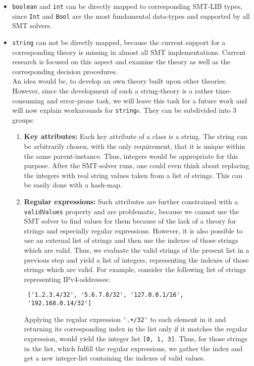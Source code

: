 \begin{itemize}
 \item \verb|boolean| and \verb|int| can be directly mapped to corresponding SMT-LIB types, since \verb|Int| and \verb|Bool| are the most fundamental data-types and supported by all SMT solvers.


 \item \verb|string| can not be directly mapped, because the current support for a corresponding theory is missing in almost all SMT implementations. Current research is focused on this aspect and examine the theory as well as the corresponding decision procedures.\\

 An idea would be, to develop an own theory built upon other theories. However, since the development of such a string-theory is a rather time-consuming and error-prone task, we will leave this task for a future work and will now explain workarounds for \verb|string|s. They can be subdivided into 3 groups:
 \begin{enumerate}
  \item \textbf{Key attributes:} Each key attribute of a class is a string. The string can be arbitrarily chosen, with the only requirement, that it is unique within the same parent-instance. Thus, integers would be appropriate for this purpose. After the SMT-solver runs, one could even think about replacing the integers with real string values taken from a list of strings. This can be easily done with a hash-map.
 
  \item \textbf{Regular expressions:} Such attributes are further constrained with a \verb|validValues| property and are problematic, because we cannot use the SMT solver to find values for them because of the lack of a theory for strings and especially regular expressions. However, it is also possible to use an external list of strings and then use the indexes of those strings which are valid. Thus, we evaluate the valid strings of the present list in a previous step and yield a list of integers, representing the indexes of those strings which are valid. For example, consider the following list of strings representing IPv4-addresses: \begin{verbatim}
 ['1.2.3.4/32', '5.6.7.8/32', '127.0.0.1/16', 
 '192.168.0.14/32']
 \end{verbatim}
  Applying the regular expression \verb|'.+/32'| to each element in it and returning its corresponding index in the list only if it matches the regular expression, would yield the integer list \verb|[0, 1, 3]|. Thus, for those strings in the list, which fulfill the regular expressions, we gather the index and get a new integer-list containing the indexes of valid values.
 

\end{enumerate}
\end{itemize}
